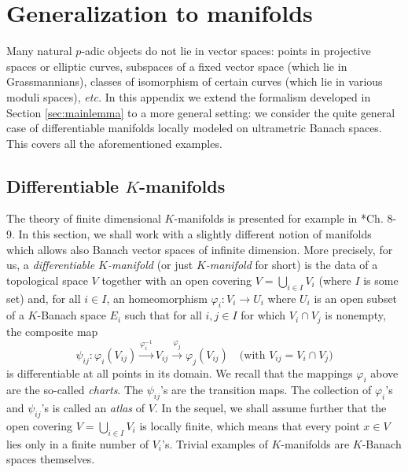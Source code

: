 \documentclass{lms}
\begin{document}
\appendix

\section{Generalization to manifolds}
\label{sec:manifold}

Many natural $p$-adic objects do not lie in vector spaces:
points in projective spaces or elliptic curves,
subspaces of a fixed vector space (which lie in Grassmannians),
classes of isomorphism of certain curves (which lie in various moduli spaces),
\emph{etc.}  In this appendix we extend the formalism 
developed in Section \ref{sec:mainlemma} to a more general setting:
we consider the quite general case of 
differentiable manifolds locally modeled on ultrametric Banach spaces.
This covers all the 
aforementioned examples.

\subsection{Differentiable $K$-manifolds}
\label{ssec:manifold}

The theory of finite dimensional $K$-manifolds is presented for example 
in \cite{schneider:11a}*{Ch. 8-9}. In this section, we shall work with
a slightly different notion of manifolds which allows also Banach vector 
spaces of infinite dimension.
More precisely, for us, a \emph{ differentiable $K$-manifold} 
(or just \emph{$K$-manifold} for short) is the data of a topological 
space $V$ together with an open covering $V = \bigcup_{i \in I} V_i$ 
(where $I$ is some set) and, for all $i \in I$, an homeomorphism 
$\varphi_i : V_i \to U_i$ where $U_i$ is an open subset of a $K$-Banach space
$E_i$ such that for all $i,j \in I$ for which $V_i \cap V_j$ is 
nonempty, the composite map
\begin{equation}
\label{eq:psiij}
\psi_{ij} : 
\varphi_i(V_{ij}) \stackrel{\varphi_i^{-1}}{\longrightarrow} 
V_{ij} \stackrel{\varphi_j}{\longrightarrow} \varphi_j(V_{ij})
\quad \text{(with } V_{ij} = V_i \cap V_j \text{)}
\end{equation}
is differentiable at all points in its domain. We recall that
the mappings $\varphi_i$ above are the so-called \emph{charts}. The
$\psi_{ij}$'s are the transition maps. The collection of $\varphi_i$'s
and $\psi_{ij}$'s is called an \emph{atlas} of $V$. In the sequel, we 
shall assume further that the open covering $V = \bigcup_{i \in I} V_i$ 
is locally finite, which means that every point $x \in V$ lies only in a 
finite number of $V_i$'s. Trivial examples of $K$-manifolds are 
$K$-Banach spaces themselves.
\end{document}
